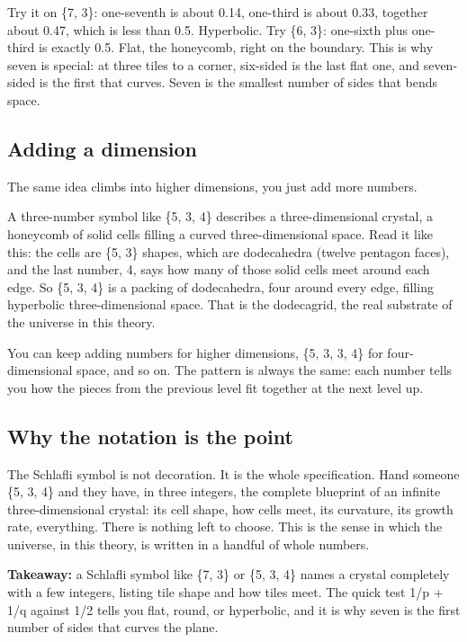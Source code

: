 Try it on \{7, 3\}: one-seventh is about 0.14, one-third is about 0.33, together about 0.47, which is less than 0.5. Hyperbolic. Try \{6, 3\}: one-sixth plus one-third is exactly 0.5. Flat, the honeycomb, right on the boundary. This is why seven is special: at three tiles to a corner, six-sided is the last flat one, and seven-sided is the first that curves. Seven is the smallest number of sides that bends space.

\subsection{Adding a dimension}

The same idea climbs into higher dimensions, you just add more numbers.

A three-number symbol like \{5, 3, 4\} describes a three-dimensional crystal, a honeycomb of solid cells filling a curved three-dimensional space. Read it like this: the cells are \{5, 3\} shapes, which are dodecahedra (twelve pentagon faces), and the last number, 4, says how many of those solid cells meet around each edge. So \{5, 3, 4\} is a packing of dodecahedra, four around every edge, filling hyperbolic three-dimensional space. That is the dodecagrid, the real substrate of the universe in this theory.

You can keep adding numbers for higher dimensions, \{5, 3, 3, 4\} for four-dimensional space, and so on. The pattern is always the same: each number tells you how the pieces from the previous level fit together at the next level up.

\subsection{Why the notation is the point}

The Schlafli symbol is not decoration. It is the whole specification. Hand someone \{5, 3, 4\} and they have, in three integers, the complete blueprint of an infinite three-dimensional crystal: its cell shape, how cells meet, its curvature, its growth rate, everything. There is nothing left to choose. This is the sense in which the universe, in this theory, is written in a handful of whole numbers.

\textbf{Takeaway:} a Schlafli symbol like \{7, 3\} or \{5, 3, 4\} names a crystal completely with a few integers, listing tile shape and how tiles meet. The quick test 1/p + 1/q against 1/2 tells you flat, round, or hyperbolic, and it is why seven is the first number of sides that curves the plane.
